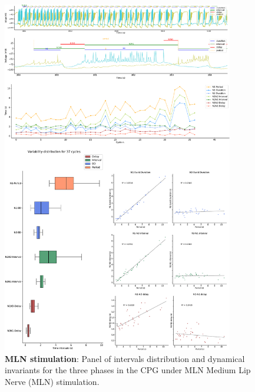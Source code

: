 \begin{figure}[htbp]
	\centering
	\includegraphics[width=0.9\textwidth]{./invariants/data/SUSSEX/MLN_driven/images/panel_with_intervals.pdf}
	\caption{\textbf{MLN stimulation}: Panel of intervals distribution and dynamical invariants for the three phases in the CPG under MLN Medium Lip Nerve (MLN) stimulation.}
	\label{fig:mln stimulation}
\end{figure}


